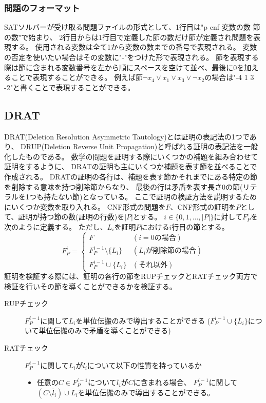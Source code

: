 \documentclass[titlepage]{jsarticle}
\begin{document}
\subsubsection{問題のフォーマット}
SATソルバーが受け取る問題ファイルの形式として、1行目は"p cnf 変数の数 節の数"で始まり、
2行目からは1行目で定義した節の数だけ節が定義され問題を表現する。
使用される変数は全て1から変数の数までの番号で表現される。
変数の否定を使いたい場合はその変数に"-"をつけた形で表現される。
節を表現する際は節に含まれる変数番号を左から順にスペースを空けて並べ、最後に0を加えることで表現することができる。
例えば節$\neg x_4 \lor x_1 \lor x_3 \lor \neg x_2$の場合は"-4 1 3 -2"と書くことで表現することができる。





\subsection{DRAT}
DRAT(Deletion Resolution Asymmetric Tautology)とは証明の表記法の1つであり、
DRUP(Deletion Reverse Unit Propagation)と呼ばれる証明の表記法を一般化したものである。
数学の問題を証明する際にいくつかの補題を組み合わせて証明をするように、
DRATの証明も主にいくつか補題を表す節を並べることで作成される。
DRATの証明の各行は、補題を表す節かそれまでにある特定の節を削除する意味を持つ削除節からなり、
最後の行は矛盾を表す長さ0の節(リテラルを1つも持たない節)となっている。
ここで証明の検証方法を説明するためにいくつか変数を取り入れる。
CNF形式の問題を$F$、CNF形式の証明を$P$として、証明が持つ節の数(証明の行数)を$|P|$とする。
$i \in \{0,1,...,|P|\}$に対して$F_{P}^{i}$を次のように定義する。
ただし、$L_i$を証明$P$における$i$行目の節とする。
\[
	F_{P}^{i} = 
	\begin{cases}
		F                           & (i=0{の場合}) \\
		F_{P}^{i-1} \setminus \{L_i\} & (L_i{が削除節の場合}) \\
		F_{P}^{i-1} \cup      \{L_i\} & ({それ以外}) 
	\end{cases}
\]
証明を検証する際には、証明の各行の節をRUPチェックとRATチェック両方で検証を行いその節を導くことができるかを検証する。
\begin{description}
	\item[RUPチェック] $F_{P}^{i-1}$に関して$L_i$を単位伝搬のみで導出することができる
		($F_{P}^{i-1} \cup \{\overline L_i\}$について単位伝搬のみで矛盾を導くことができる)
	\item[RATチェック] $F_{P}^{i-1}$に関して$L_i$が$l_i$について以下の性質を持っているか \\
		\begin{itemize}
			\item 任意の$C \in F_{P}^{i-1}$について$\overline l_i$が$C$に含まれる場合、
				$F_{P}^{i-1}$に関して$(C \setminus {\overline l_i}) \cup L_i$を単位伝搬のみで導出することができる。
		\end{itemize}
\end{description}
\end{document}
